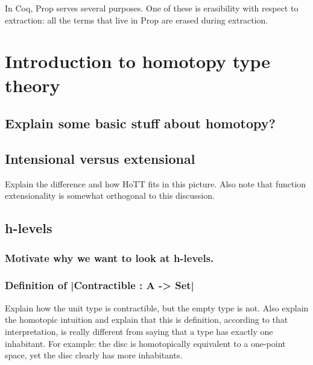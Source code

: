 In Coq, Prop serves several purposes. One of these is erasibility with
respect to extraction: all the terms that live in Prop are erased
during extraction.


\section{Introduction to homotopy type theory}
\label{sec-2}

\subsection{Explain some basic stuff about homotopy?}
\label{sec-2.1}


\subsection{Intensional versus extensional}
\label{sec-2.2}

Explain the difference and how HoTT fits in this picture. Also note
that function extensionality is somewhat orthogonal to this
discussion.

\subsection{h-levels}
\label{sec-2.3}

\subsubsection{Motivate why we want to look at h-levels.}
\label{sec-2.3.1}


\subsubsection{Definition of |Contractible : A -> Set|}
\label{sec-2.3.2}


Explain how the unit type is contractible, but the empty type is
not. Also explain the homotopic intuition and explain that this is
definition, according to that interpretation, is really different from
saying that a type has exactly one inhabitant. For example: the disc
is homotopically equivalent to a one-point space, yet the disc clearly
has more inhabitants.

